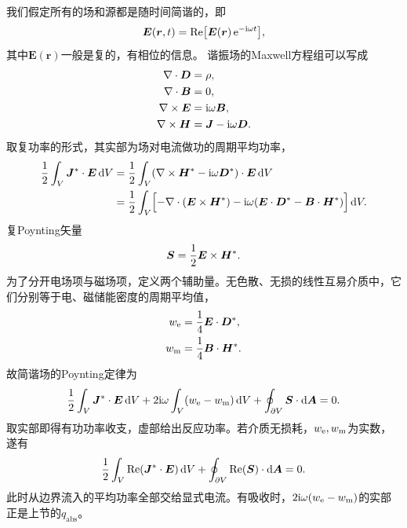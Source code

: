 我们假定所有的场和源都是随时间简谐的，即 
\[
    \bm E(\bm r,t) = \operatorname{Re}\bigl[\bm E(\bm r)\mathop{}\!\mathrm{e}^{-\mathrm{i}\omega t}\bigr],
\]
其中$\bm E(\bm r)$一般是复的，有相位的信息。
谐振场的Maxwell方程组可以写成
\begin{subequations}
    \begin{align}
        \nabla\cdot\bm D &= \rho,\\
        \nabla\cdot\bm B &= 0,\\
        \label{eqn:Maxwell curlE freq}
        \nabla\times\bm E &= \mathrm{i}\omega\bm B,\\
        \label{eqn:Maxwell curlH freq}
        \nabla\times\bm H &= \bm J - \mathrm{i}\omega\bm D.
    \end{align}
\end{subequations}
取复功率的形式，其实部为场对电流做功的周期平均功率，
\begin{align*}
    \frac12\int_V\bm J^\ast \cdot \bm E\mathop{}\!\mathrm{d} V &= \frac12\int_V(\nabla\times\bm H^\ast - \mathrm{i}\omega\bm D^\ast) \cdot \bm E\mathop{}\!\mathrm{d} V\\
    &= \frac12\int_V\Bigl[-\nabla\cdot(\bm E \times \bm H^\ast) - \mathrm{i}\omega(\bm E \cdot \bm D^\ast - \bm B \cdot \bm H^\ast)\Bigr]\mathop{}\!\mathrm{d} V.
\end{align*}
复Poynting矢量
\begin{equation}
    \bm S = \frac12\bm E \times \bm H^\ast.
\end{equation}
为了分开电场项与磁场项，定义两个辅助量。无色散、无损的线性互易介质中，它们分别等于电、磁储能密度的周期平均值，
\begin{subequations}
    \begin{align}
        w_\mathrm e &= \frac14\bm E \cdot \bm D^\ast,\\
        w_\mathrm m &= \frac14\bm B \cdot \bm H^\ast.
    \end{align}
\end{subequations}
故简谐场的Poynting定律为
\begin{equation}
    \frac12\int_V\bm J^\ast \cdot \bm E\mathop{}\!\mathrm{d} V + 2\mathrm{i}\omega\int_V(w_\mathrm e - w_\mathrm m)\mathop{}\!\mathrm{d} V + \oint_{\partial V}\bm S \cdot \mathop{}\!\mathrm{d}\bm A = 0.
\end{equation}
取实部即得有功功率收支，虚部给出反应功率。若介质无损耗，$w_\mathrm e,w_\mathrm m$为实数，遂有
\begin{equation}
    \label{eq:ed-harmonic-power-balance}
    \frac12\int_V\operatorname{Re}(\bm J^\ast \cdot \bm E)\mathop{}\!\mathrm{d} V
       + \oint_{\partial V}\operatorname{Re}(\bm S) \cdot \mathop{}\!\mathrm{d}\bm A = 0 .
\end{equation}
此时从边界流入的平均功率全部交给显式电流。有吸收时，$2\mathrm{i}\omega(w_\mathrm e - w_\mathrm m)$的实部正是上节的$q_{\mathrm{abs}}$。
